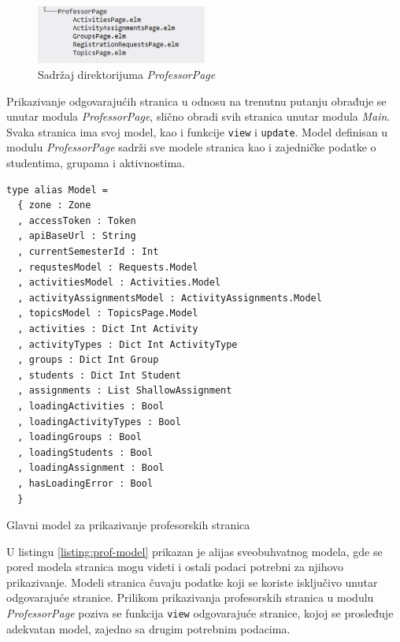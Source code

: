 \documentclass[12pt,oneside]{memoir}
\begin{document}
\begin{figure}[!ht]
  \centering
  \includegraphics[width=0.5\textwidth]{prof-page-dir.png}
  \caption{Sadržaj direktorijuma \emph{ProfessorPage}}
  \label{fig:prof-dir}
\end{figure}

Prikazivanje odgovarajućih stranica u odnosu na trenutnu putanju obrađuje se unutar modula
\emph{ProfessorPage}, slično obradi svih stranica unutar modula \emph{Main}. 
Svaka stranica ima svoj model, kao i funkcije \texttt{view} i \texttt{update}.
Model definisan u modulu \emph{ProfessorPage} sadrži sve modele stranica
kao i zajedničke podatke o studentima, grupama i aktivnostima. 
\begin{listing}[h]
\begin{verbatim}
type alias Model =
  { zone : Zone
  , accessToken : Token
  , apiBaseUrl : String
  , currentSemesterId : Int
  , requstesModel : Requests.Model
  , activitiesModel : Activities.Model
  , activityAssignmentsModel : ActivityAssignments.Model
  , topicsModel : TopicsPage.Model
  , activities : Dict Int Activity
  , activityTypes : Dict Int ActivityType
  , groups : Dict Int Group
  , students : Dict Int Student
  , assignments : List ShallowAssignment
  , loadingActivities : Bool
  , loadingActivityTypes : Bool
  , loadingGroups : Bool
  , loadingStudents : Bool
  , loadingAssignment : Bool
  , hasLoadingError : Bool
  }
\end{verbatim}
\caption{Glavni model za prikazivanje profesorskih stranica}
\label{listing:prof-model}
\end{listing}
U listingu \ref{listing:prof-model} prikazan je alijas sveobuhvatnog modela, gde se pored
modela stranica mogu videti i ostali podaci potrebni za njihovo prikazivanje.
Modeli stranica čuvaju podatke koji se koriste isključivo unutar odgovarajuće stranice.
Prilikom prikazivanja profesorskih stranica u modulu \emph{ProfessorPage}
poziva se funkcija \texttt{view} odgovarajuće stranice, kojoj se prosleđuje adekvatan
model, zajedno sa drugim potrebnim podacima.
\end{document}
